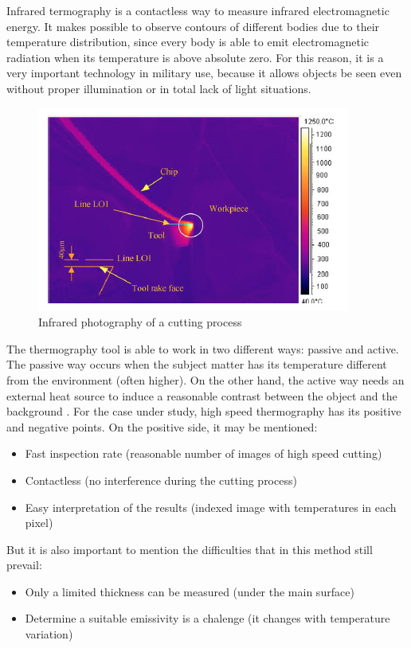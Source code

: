 	Infrared termography is a contactless way to measure infrared electromagnetic energy. It makes possible to observe contours of different bodies due to their temperature distribution, since every body is able to emit electromagnetic radiation when its temperature is above absolute zero. For this reason, it is a very important technology in military use, because it allows objects be seen even without proper illumination or in total lack of light situations.

	\begin{figure}[H]
		\centering
		\captionsetup{justification=centering}
		\includegraphics[scale=0.75]{Cap2/InfraRed/exinfrared.png}
		\caption{Infrared photography of a cutting process \cite{abukhshim2006heat}}
		\label{fig:exinfrared}
	\end{figure}

	The thermography tool is able to work in two different ways: passive and active. The passive way occurs when the subject matter has its temperature different from the environment (often higher). On the other hand, the active way needs an external heat source to induce a reasonable contrast between the object and the background \cite {maldague2000}.
	For the case under study, high speed thermography has its positive and negative points. On the positive side, it may be mentioned:
	\begin{itemize}
		\item Fast inspection rate (reasonable number of images of high speed cutting)
		\item Contactless (no interference during the cutting process)
		\item Easy interpretation of the results (indexed image with temperatures in each pixel)
	\end{itemize}
	But it is also important to mention the difficulties that in this method still prevail:
	\begin{itemize}
		\item Only a limited thickness can be measured (under the main surface)
		\item Determine a suitable emissivity is a chalenge (it changes with temperature variation)
	\end{itemize}